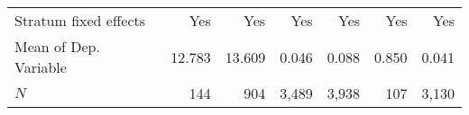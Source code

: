 \begin{tabular}{lrrrrrr}
\midrule
Stratum fixed effects      &     Yes &                       Yes &                                                  Yes &                                           Yes &                                                 Yes &                                                 Yes \\ 
Mean of Dep. Variable      &  12.783 &                    13.609 &                                                0.046 &                                         0.088 &                                               0.850 &                                               0.041 \\ 
$N$                        &     144 &                       904 &                                                3,489 &                                         3,938 &                                                 107 &                                               3,130 \\ 
\bottomrule
\end{tabular}
